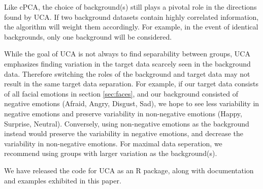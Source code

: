 \documentclass[12pt]{article}
\begin{document}
Like cPCA, the choice of background(s) still plays a pivotal role in the directions found by UCA. If two background datasets contain highly correlated information, the algorithm will weight them accordingly. For example, in the event of identical backgrounds, only one background will be considered.

While the goal of UCA is not always to find separability between groups, UCA emphasizes finding variation in the target data scarcely seen in the background data. Therefore switching the roles of the background and target data may not result in the same target data separation. For example, if our target data consists of all facial emotions in section \ref{sec:faces}, and our background consisted of negative emotions (Afraid, Angry, Disgust, Sad), we hope to see less variability in negative emotions and preserve variability in non-negative emotions (Happy, Surprise, Neutral).
Conversely, using non-negative emotions as the background instead would preserve the variability in negative emotions, and decrease the variability in non-negative emotions. For maximal data seperation, we recommend using groups with larger variation as the background(s).

We have released the code for UCA as an R package, along with documentation and examples exhibited in this paper. 
\end{document}
